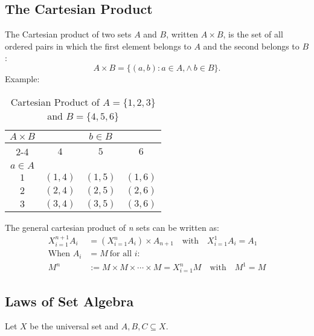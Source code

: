 \subsection{The Cartesian Product}
\smallskip
The Cartesian product of two sets $A$ and $B$, written $A \times B$, is the set of all ordered pairs in which the first element belongs to $A$ and the second belongs to $B$:
\[A \times B = \{ (a, b) : a \in A, \land\ b \in B\}.\]
\smallskip
Example:
\begin{table}[H]
	\centering
	\caption{Cartesian Product of $A = \{1, 2, 3\}$ and $B = \{4, 5, 6\}$}
	\begin{tabular}{|c|c|c|c|}
		\hline
		\multirow{3}{*}{$A \times B$} & \multicolumn{3}{c|}{$b \in B$}                       \\
		\cline{2-4}
		                              & $4$                            & $5$      & $6$      \\
		\hline
		$a \in A$                     &                                &          &          \\
		\hline
		$1$                           & $(1, 4)$                       & $(1, 5)$ & $(1, 6)$ \\
		\hline
		$2$                           & $(2, 4)$                       & $(2, 5)$ & $(2, 6)$ \\
		\hline
		$3$                           & $(3, 4)$                       & $(3, 5)$ & $(3, 6)$ \\
		\hline
	\end{tabular}
	\label{tab:cartesian_product}
\end{table}

The general cartesian product of \textit{n} sets can be written as:
\begin{align*}
	X_{i = 1}^{n + 1} A_i & = \left( X_{i = 1}^{n} A_i \right) \times A_{n + 1} \quad \text{with} \quad X_{i = 1}^{1} A_i = A_1 \\
	\text{When } A_i      & = M \ \text{for all } i:                                                                            \\
	M^n                   & := M \times M \times \cdots \times M = X_{i = 1}^{n} M \quad \text{with} \quad M^1 = M
\end{align*}

\subsection{Laws of Set Algebra}
Let $X$ be the universal set and $A, B, C \subseteq X$.

